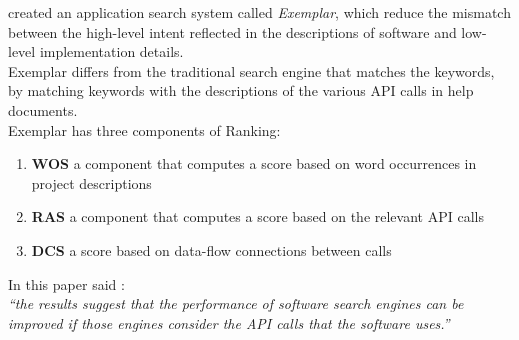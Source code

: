 \documentclass[12pt,mscthesis]{usiinfthesis}
\begin{document}
	\citet{McMillan:2011:FRF:1985793.1986032} created an application search system called \textit{Exemplar}, which reduce the mismatch between the high-level intent reflected in the descriptions of software and low-level implementation details.\\ Exemplar differs from the traditional search engine that matches the keywords, by matching keywords with the descriptions of the various API calls in help documents.\\
	Exemplar has three components of Ranking: 
	\begin{enumerate}
		\item \textbf{WOS} a component that computes a score based on word occurrences in project descriptions
		\item \textbf{RAS} a component that computes a score based on the relevant API calls
		\item \textbf{DCS} a score based on data-flow connections between calls
	\end{enumerate}
	In this paper \citet{McMillan:2011:FRF:1985793.1986032}  said : \\
	\textit{``the results suggest that the performance of software search engines can be improved if those engines consider the API calls that the software uses.''}
\end{document}
